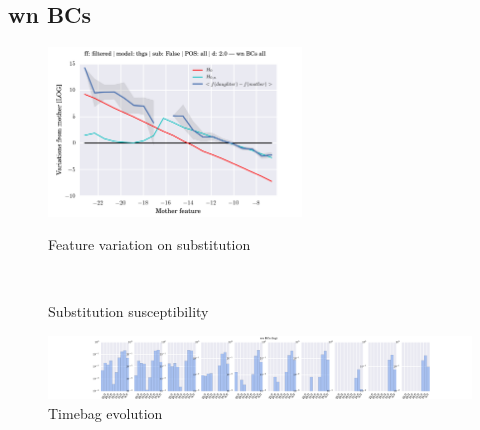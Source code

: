 \subsection{wn BCs}
\begin{figure}[h!]
    \centering
    \includegraphics[width=0.6\textwidth]{images/feature-cards/wn_BCs/feature_variations.png}
    \caption{Feature variation on substitution}
	~
	\caption{Substitution susceptibility}
    \includegraphics[width=\textwidth]{images/feature-cards/wn_BCs/timebags_evolution-hist.png}
	\caption{Timebag evolution}
\end{figure}


\clearpage
